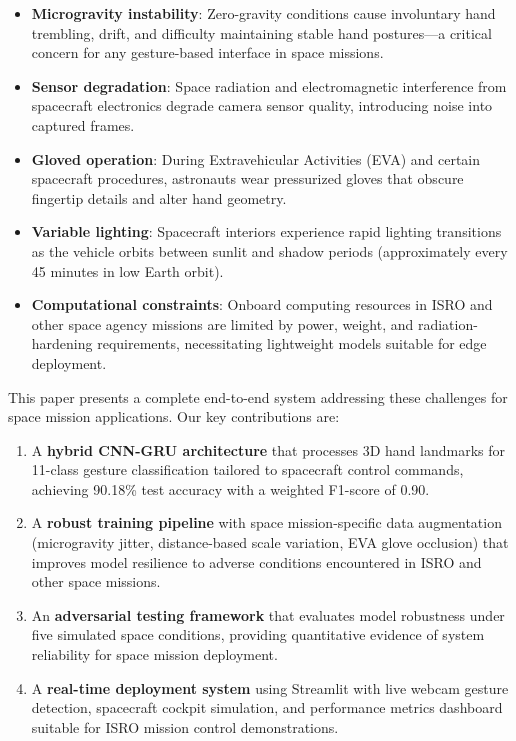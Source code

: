 \documentclass[conference]{IEEEtran}
\begin{document}
\begin{itemize}
    \item \textbf{Microgravity instability}: Zero-gravity conditions cause involuntary hand trembling, drift, and difficulty maintaining stable hand postures—a critical concern for any gesture-based interface in space missions.
    \item \textbf{Sensor degradation}: Space radiation and electromagnetic interference from spacecraft electronics degrade camera sensor quality, introducing noise into captured frames.
    \item \textbf{Gloved operation}: During Extravehicular Activities (EVA) and certain spacecraft procedures, astronauts wear pressurized gloves that obscure fingertip details and alter hand geometry.
    \item \textbf{Variable lighting}: Spacecraft interiors experience rapid lighting transitions as the vehicle orbits between sunlit and shadow periods (approximately every 45 minutes in low Earth orbit).
    \item \textbf{Computational constraints}: Onboard computing resources in ISRO and other space agency missions are limited by power, weight, and radiation-hardening requirements, necessitating lightweight models suitable for edge deployment.
\end{itemize}

This paper presents a complete end-to-end system addressing these challenges for space mission applications. Our key contributions are:

\begin{enumerate}
    \item A \textbf{hybrid CNN-GRU architecture} that processes 3D hand landmarks for 11-class gesture classification tailored to spacecraft control commands, achieving 90.18\% test accuracy with a weighted F1-score of 0.90.
    \item A \textbf{robust training pipeline} with space mission-specific data augmentation (microgravity jitter, distance-based scale variation, EVA glove occlusion) that improves model resilience to adverse conditions encountered in ISRO and other space missions.
    \item An \textbf{adversarial testing framework} that evaluates model robustness under five simulated space conditions, providing quantitative evidence of system reliability for space mission deployment.
    \item A \textbf{real-time deployment system} using Streamlit with live webcam gesture detection, spacecraft cockpit simulation, and performance metrics dashboard suitable for ISRO mission control demonstrations.
\end{enumerate}
\end{document}
